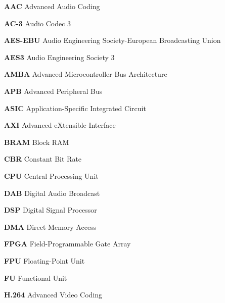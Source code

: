 \begin{description}
    \item \hspace{2mm} \textbf{AAC} Advanced Audio Coding
    \item \hspace{2mm} \textbf{AC-3} Audio Codec 3
    \item \hspace{2mm} \textbf{AES-EBU} Audio Engineering Society-European Broadcasting Union
    \item \hspace{2mm} \textbf{AES3} Audio Engineering Society 3
    \item \hspace{2mm} \textbf{AMBA} Advanced Microcontroller Bus Architecture
    \item \hspace{2mm} \textbf{APB} Advanced Peripheral Bus
    \item \hspace{2mm} \textbf{ASIC} Application-Specific Integrated Circuit
    \item \hspace{2mm} \textbf{AXI} Advanced eXtensible Interface
    \item \hspace{2mm} \textbf{BRAM} Block RAM
    \item \hspace{2mm} \textbf{CBR} Constant Bit Rate
    \item \hspace{2mm} \textbf{CPU} Central Processing Unit
    \item \hspace{2mm} \textbf{DAB} Digital Audio Broadcast
    \item \hspace{2mm} \textbf{DSP} Digital Signal Processor
    \item \hspace{2mm} \textbf{DMA} Direct Memory Access
    \item \hspace{2mm} \textbf{FPGA} Field-Programmable Gate Array
    \item \hspace{2mm} \textbf{FPU} Floating-Point Unit
    \item \hspace{2mm} \textbf{FU} Functional Unit
    \item \hspace{2mm} \textbf{H.264} Advanced Video Coding

\end{description}
